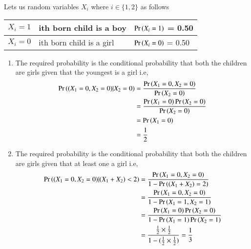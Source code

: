 Lets us random variables $X_i$ where $i \in \{1,2\}$ as follows
\begin{table}[htbp]
\centering
\begin{tabular}{|l|l|l|}\hline
$X_i = 1$	&ith born child is a boy	&$\Pr\left(X_i = 1\right)$ = 0.50\\\hline
$X_i = 0$	&ith born child is a girl	&$\Pr\left(X_i = 0\right)$ = 0.50\\\hline
\end{tabular}
\end{table}


\begin{enumerate}
\item 
The required probability is the conditional probability that both the children are girls given that the youngest is a girl i.e,
\begin{align}
     \Pr\left((X_1=0,X_2=0)|X_2=0\right) &= \frac{\Pr\left(X_1=0,X_2=0\right)}{\Pr\left(X_2=0\right)}\notag\\
           &= \frac{\Pr\left(X_1=0\right)\Pr\left(X_2=0\right)}{\Pr\left(X_2=0\right)}\notag\\ 
	  &= \Pr\left(X_1=0\right)\notag\\
          &= \frac{1}{2}\notag
\end{align}
\item
The required probability is the conditional probability that both the children are girls given that at least one a girl i.e,
\begin{align}
	\Pr\left((X_1=0,X_2=0)|(X_1+X_2)<2\right) &= \frac{\Pr\left(X_1=0,X_2=0\right)}{1-\Pr\left((X_1+X_2)=2\right)}\notag\\
	&= \frac{\Pr\left(X_1=0,X_2=0\right)}{1-\Pr\left(X_1=1,X_2=1\right)}\notag\\
	&= \frac{\Pr\left(X_1=0\right)\Pr\left(X_2=0\right)}{1-\Pr\left(X_1=1\right)\Pr\left(X_2=1\right)}\notag\\
	&= \frac{\frac{1}{2}\times\frac{1}{2}}{1- (\frac{1}{2}\times\frac{1}{2})} = \frac{1}{3}\notag
\end{align}
\end{enumerate}
